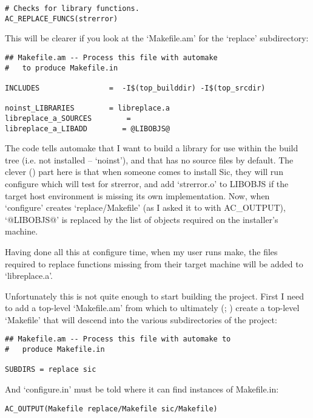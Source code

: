 \begin{Verbatim}[frame=single]
# Checks for library functions.
AC_REPLACE_FUNCS(strerror)
\end{Verbatim}

This will be clearer if you look at the `Makefile.am' for the `replace' 
subdirectory: 

\begin{Verbatim}[frame=single]
## Makefile.am -- Process this file with automake
#   to produce Makefile.in

INCLUDES                =  -I$(top_builddir) -I$(top_srcdir)

noinst_LIBRARIES        = libreplace.a
libreplace_a_SOURCES        = 
libreplace_a_LIBADD        = @LIBOBJS@
\end{Verbatim}

The code tells automake that I want to build a library for use within the 
build tree (i.e. not installed -- `noinst'), and that has no source files 
by default. The clever ({\MjQ{}}) part here is that when someone comes to 
install Sic, they will run configure which will test for strerror, and 
add `strerror.o' to LIBOBJS if the target host environment is missing its 
own implementation. Now, when `configure' creates `replace/Makefile' (as I 
asked it to with AC\_{}OUTPUT), `@LIBOBJS@' is replaced by the list of objects 
required on the installer's machine. 

Having done all this at configure time, when my user runs make, the files 
required to replace functions missing from their target machine will be added 
to `libreplace.a'. 

Unfortunately this is not quite enough to start building the project. First 
I need to add a top-level `Makefile.am' from which to ultimately ({\MbQ{}}; {\McQ{}})
create a top-level `Makefile' that will descend into the various 
subdirectories of the project: 

\begin{Verbatim}[frame=single]
## Makefile.am -- Process this file with automake to 
#   produce Makefile.in

SUBDIRS = replace sic
\end{Verbatim}

 And `configure.in' must be told where it can find instances of Makefile.in: 

\begin{Verbatim}[frame=single]
AC_OUTPUT(Makefile replace/Makefile sic/Makefile)
\end{Verbatim}

